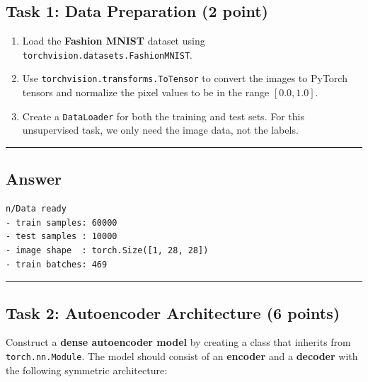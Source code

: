 \documentclass[
  letterpaper,
  DIV=11,
  numbers=noendperiod]{scrartcl}
\providecommand{\tightlist}{%
  \setlength{\itemsep}{0pt}\setlength{\parskip}{0pt}}\usepackage{longtable,booktabs,array}
\begin{document}
\subsection{Task 1: Data Preparation (2
point)}\label{task-1-data-preparation-2-point}

\begin{enumerate}
\def\labelenumi{\arabic{enumi}.}
\tightlist
\item
  Load the \textbf{Fashion MNIST} dataset using
  \texttt{torchvision.datasets.FashionMNIST}.
\item
  Use \texttt{torchvision.transforms.ToTensor} to convert the images to
  PyTorch tensors and normalize the pixel values to be in the range
  \([0.0, 1.0]\).
\item
  Create a \texttt{DataLoader} for both the training and test sets. For
  this unsupervised task, we only need the image data, not the labels.
\end{enumerate}

\begin{center}\rule{0.5\linewidth}{0.5pt}\end{center}

\subsection{Answer}\label{answer-3}

\label{task1}
\begin{verbatim}
n/Data ready
- train samples: 60000
- test samples : 10000
- image shape  : torch.Size([1, 28, 28])
- train batches: 469
\end{verbatim}

\begin{center}\rule{0.5\linewidth}{0.5pt}\end{center}

\subsection{Task 2: Autoencoder Architecture (6
points)}\label{task-2-autoencoder-architecture-6-points}

Construct a \textbf{dense autoencoder model} by creating a class that
inherits from \texttt{torch.nn.Module}. The model should consist of an
\textbf{encoder} and a \textbf{decoder} with the following symmetric
architecture:
\end{document}

